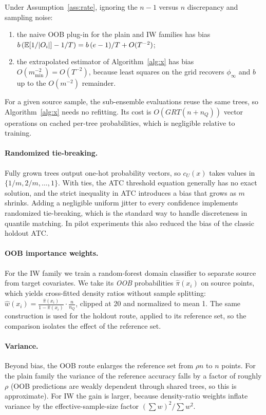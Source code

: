 \begin{proposition}
\label{prop:bias}
Under Assumption~\ref{ass:rate}, ignoring the $n-1$ versus $n$ discrepancy and sampling noise:
\begin{enumerate}
\item[(i)] the naive OOB plug-in for the plain and IW families has bias $b\,(\mathbb{E}[1/|O_i|]-1/T)=b\,(e-1)/T+O(T^{-2})$;
\item[(ii)] the extrapolated estimator of Algorithm~\ref{alg:x} has bias $O(m_{\min}^{-2})=O(T^{-2})$, because least squares on the grid recovers $\phi_\infty$ and $b$ up to the $O(m^{-2})$ remainder.
\end{enumerate}
\end{proposition}
\noindent For a given source sample, the sub-ensemble evaluations reuse the same trees, so Algorithm~\ref{alg:x} needs no refitting. Its cost is $O(GRT(n+n_Q))$ vector operations on cached per-tree probabilities, which is negligible relative to training.

\paragraph{Randomized tie-breaking.}
Fully grown trees output one-hot probability vectors, so $c_U(x)$ takes values in $\{1/m,2/m,\dots,1\}$. With ties, the ATC threshold equation generally has no exact solution, and the strict inequality in ATC introduces a bias that grows as $m$ shrinks. Adding a negligible uniform jitter to every confidence implements randomized tie-breaking, which is the standard way to handle discreteness in quantile matching. In pilot experiments this also reduced the bias of the classic holdout ATC.

\paragraph{OOB importance weights.}
For the IW family we train a random-forest domain classifier to separate source from target covariates. We take its \emph{OOB} probabilities $\hat\pi(x_i)$ on source points, which yields cross-fitted density ratios without sample splitting: $\hat w(x_i)=\frac{\hat\pi(x_i)}{1-\hat\pi(x_i)}\cdot\frac{n}{n_Q}$, clipped at 20 and normalized to mean 1. The same construction is used for the holdout route, applied to its reference set, so the comparison isolates the effect of the reference set.

\paragraph{Variance.}
Beyond bias, the OOB route enlarges the reference set from $\rho n$ to $n$ points. For the plain family the variance of the reference accuracy falls by a factor of roughly $\rho$ (OOB predictions are weakly dependent through shared trees, so this is approximate). For IW the gain is larger, because density-ratio weights inflate variance by the effective-sample-size factor $(\sum w)^2/\sum w^2$.
